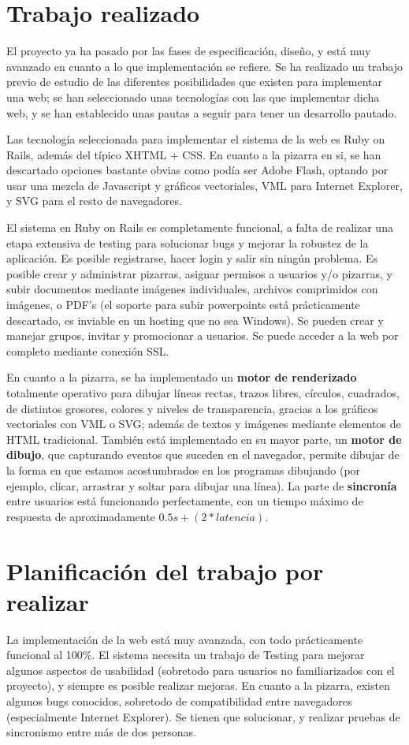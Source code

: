 \documentclass [11pt]{article}
\begin{document}
\section{Trabajo realizado}
El proyecto ya ha pasado por las fases de especificación, diseño, y está muy avanzado en cuanto a lo que implementación se refiere. Se ha realizado un trabajo previo de estudio de las diferentes posibilidades que existen para implementar una web; se han seleccionado unas tecnologías con las que implementar dicha web, y se han establecido unas pautas a seguir para tener un desarrollo pautado.

Las tecnología seleccionada para implementar el sistema de la web es Ruby on Rails, además del típico XHTML + CSS. En cuanto a la pizarra en si, se han descartado opciones bastante obvias como podía ser Adobe Flash, optando por usar una mezcla de Javascript y gráficos vectoriales, VML para Internet Explorer, y SVG para el resto de navegadores.

El sistema en Ruby on Rails es completamente funcional, a falta de realizar una etapa extensiva de testing para solucionar bugs y mejorar la robustez de la aplicación. Es posible registrarse, hacer login  y salir sin ningún problema. Es posible crear y administrar pizarras, asignar permisos a usuarios y/o pizarras, y subir documentos mediante imágenes individuales, archivos comprimidos con imágenes, o PDF's (el soporte para subir powerpoints está prácticamente descartado, es inviable en un hosting que no sea Windows). Se pueden crear y manejar grupos, invitar y promocionar a usuarios. Se puede acceder a la web por completo mediante conexión SSL. 

En cuanto a la pizarra, se ha implementado un \textbf{motor de renderizado} totalmente operativo para dibujar líneas rectas, trazos libres, círculos, cuadrados, de distintos grosores, colores y niveles de transparencia, gracias a los gráficos vectoriales con VML o SVG; además de textos y imágenes mediante elementos de HTML tradicional. También está implementado en su mayor parte, un \textbf{motor de dibujo}, que capturando eventos que suceden en el navegador, permite dibujar de la forma en que estamos acostumbrados en los programas dibujando (por ejemplo, clicar, arrastrar y soltar para dibujar una línea). La parte de \textbf{sincronía} entre usuarios está funcionando perfectamente, con un tiempo máximo de respuesta de aproximadamente $0.5s + (2 * latencia)$.

\section{Planificación del trabajo por realizar}
La implementación de la web está muy avanzada, con todo prácticamente funcional al 100\%. El sistema necesita un trabajo de Testing para mejorar algunos aspectos de usabilidad (sobretodo para usuarios no familiarizados con el proyecto), y siempre es posible realizar mejoras. En cuanto a la pizarra, existen algunos bugs conocidos, sobretodo de compatibilidad entre navegadores (especialmente Internet Explorer). Se tienen que solucionar, y realizar pruebas de sincronismo entre más de dos personas.
\end{document}
